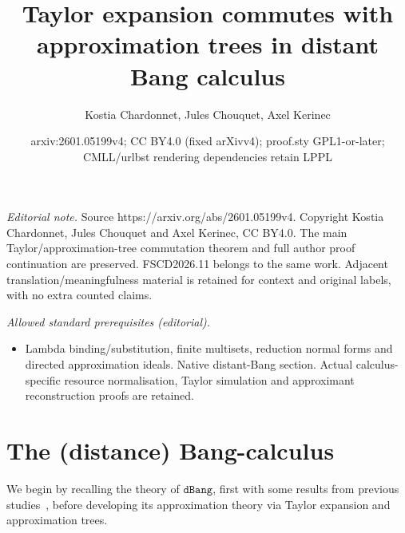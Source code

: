 \documentclass[10pt,a4paper]{article}
\title{Taylor expansion commutes with approximation trees in distant Bang calculus}
\author{Kostia Chardonnet, Jules Chouquet, Axel Kerinec}
\date{arxiv:2601.05199v4; CC BY4.0 (fixed arXivv4); proof.sty GPL1-or-later; CMLL/urlbst rendering dependencies retain LPPL}
\newcommand{\<}{\langle}
\renewcommand{\>}{\rangle}
\newcommand{\dbang}{\ensuremath{\mathtt{dBang}}}
\begin{document}
\maketitle
\noindent\textit{Editorial note.} Source https://arxiv.org/abs/2601.05199v4. Copyright Kostia Chardonnet, Jules Chouquet and Axel Kerinec, CC BY4.0. The main Taylor/approximation-tree commutation theorem and full author proof continuation are preserved. FSCD2026.11 belongs to the same work. Adjacent translation/meaningfulness material is retained for context and original labels, with no extra counted claims.\par\medskip
\noindent\textit{Allowed standard prerequisites (editorial).}\begin{itemize}
\item Lambda binding/substitution, finite multisets, reduction normal forms and directed approximation ideals. Native distant-Bang section. Actual calculus-specific resource normalisation, Taylor simulation and approximant reconstruction proofs are retained.
\end{itemize}\medskip
\setcounter{section}{1}\section{The (distance) Bang-calculus}\label{sec:dbang}
We begin by recalling the theory of \dbang{}, first
with some results from previous
studies~\cite{kag24,agk24d,bucciarelli2023bang}, before developing its approximation theory via Taylor expansion and approximation trees.

\end{document}
